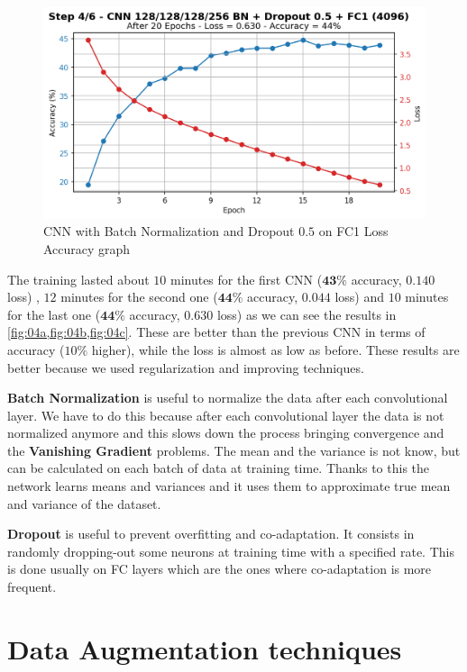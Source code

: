 \documentclass[a4paper, 11pt]{article}
\begin{document}
	\begin{figure}[ht!]
		\centering
		\includegraphics[width=0.62\paperwidth]{img/fig04c.png}
		\caption{CNN with Batch Normalization and Dropout $0.5$ on FC1 Loss Accuracy graph}
		\label{fig:04c}
	\end{figure}
	\FloatBarrier
	\newpage
	The training lasted about $10$ minutes for the first CNN ($\boldsymbol{43\%}$ accuracy, $\boldsymbol{0.140}$ loss)  , $12$ minutes for the second one ($\boldsymbol{44\%}$ accuracy, $\boldsymbol{0.044}$ loss) and $10$ minutes for the last one ($\boldsymbol{44\%}$ accuracy, $\boldsymbol{0.630}$ loss) as we can see  the results in \vref{fig:04a,fig:04b,fig:04c}.
	These are better than the previous CNN in terms of accuracy ($10\%$ higher), while the loss is almost as low as before. 
	These results are better because we used regularization and improving techniques.
	
	\textbf{Batch Normalization} is useful to normalize the data after each convolutional layer. We have to do this because after each convolutional layer the data is not normalized anymore and this slows down the process bringing convergence and the \textbf{Vanishing Gradient} problems. The mean and the variance is not know, but can be calculated on each batch of data at training time. Thanks to this the network  learns means and variances and it uses them to approximate true mean and variance of the dataset.
	
	\textbf{Dropout} is useful to prevent overfitting and co-adaptation. It consists in randomly dropping-out some neurons at training time with a specified rate. This is done usually on FC layers which are the ones where co-adaptation is more frequent. 
	
	\section{Data Augmentation techniques}
	
\end{document}
